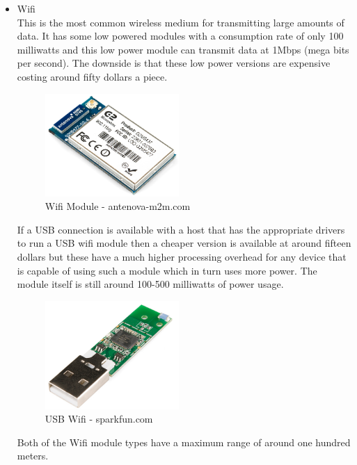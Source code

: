 \begin{itemize}
\item Wifi
\\This is the most common wireless medium for transmitting large amounts of data.  It has some low powered modules with a consumption rate of only 100 milliwatts and this low power module can transmit data at 1Mbps (mega bits per second).  The downside is that these low power versions are expensive costing around fifty dollars a piece.
\begin{figure}[h]
\centering
        \includegraphics[width=2.0in] {Images/wifi-module.jpg}
        \caption{Wifi Module - antenova-m2m.com}
        \label{Wifi Module}
\end{figure}
If a USB connection is available with a host that has the appropriate drivers to run a USB wifi module then a cheaper version is available at around fifteen dollars but these have a much higher processing overhead for any device that is capable of using such a module which in turn uses more power.  The module itself is still around 100-500 milliwatts of power usage.
\begin{figure}[h]
\centering
        \includegraphics[width=2.0in] {Images/usb-wifi.jpg}
        \caption{USB Wifi - sparkfun.com}
        \label{Usb Wifi}
\end{figure}
Both of the Wifi module types have a maximum range of around one hundred meters.


\end{itemize}

